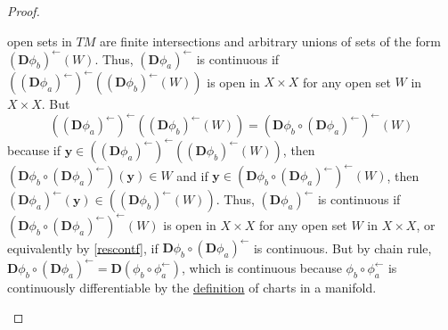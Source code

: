 \documentclass[letterpaper,12pt]{article}
\theoremstyle{plain}
\theoremstyle{plain}
\theoremstyle{definition}
\begin{document}
\begin{proof}
\begin{enumerate}
open sets in $TM$ are finite intersections and arbitrary unions of sets of the form $(\mathbf{D}\phi_b)^{\leftarrow}(W)$. Thus, $(\mathbf{D}\phi_a)^{\leftarrow}$ is continuous if $\left(\left(\mathbf{D}\phi_a\right)^{\leftarrow}\right)^{\leftarrow}\left( (\mathbf{D}\phi_b)^{\leftarrow}(W) \right)$ is open in $X\times X$ for any open set $W$ in $X \times X$. But
\[ \left(\left(\mathbf{D}\phi_a\right)^{\leftarrow}\right)^{\leftarrow}\left( (\mathbf{D}\phi_b)^{\leftarrow}(W) \right) = \left(\mathbf{D}\phi_b \circ \left( \mathbf{D}\phi_a \right)^{\leftarrow} \right)^{\leftarrow}(W) \]
because if $\mathbf{y} \in \left(\left(\mathbf{D}\phi_a\right)^{\leftarrow}\right)^{\leftarrow}\left( (\mathbf{D}\phi_b)^{\leftarrow}(W) \right)$, then $\left(\mathbf{D}\phi_b \circ \left( \mathbf{D}\phi_a \right)^{\leftarrow} \right)(\mathbf{y})\in W$ and if $\mathbf{y} \in \left(\mathbf{D}\phi_b \circ \left( \mathbf{D}\phi_a \right)^{\leftarrow} \right)^{\leftarrow}(W)$, then $\left(\mathbf{D}\phi_a\right)^{\leftarrow}(\mathbf{y}) \in \left( (\mathbf{D}\phi_b)^{\leftarrow}(W) \right)$.
Thus, $(\mathbf{D}\phi_a)^{\leftarrow}$ is continuous if $\left(\mathbf{D}\phi_b \circ \left( \mathbf{D}\phi_a \right)^{\leftarrow} \right)^{\leftarrow}(W)$ is open in $X\times X$ for any open set $W$ in $X \times X$, or equivalently by \autoref{rescontf}, if $\mathbf{D}\phi_b \circ \left( \mathbf{D}\phi_a \right)^{\leftarrow}$ is continuous. But by chain rule, $\mathbf{D}\phi_b \circ \left( \mathbf{D}\phi_a \right)^{\leftarrow} = \mathbf{D}\left( \phi_b \circ \phi_a^{\leftarrow} \right)$, which is continuous because $\phi_b \circ \phi_a^{\leftarrow}$ is continuously differentiable by the \hyperref[defmfold]{definition} of charts in a manifold. 
\end{enumerate}


\end{proof}
\end{document}
